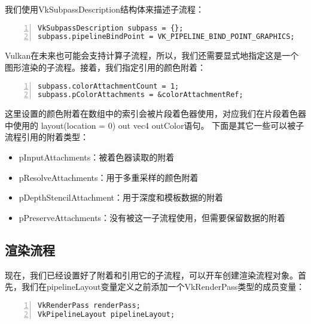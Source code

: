 \documentclass{ctexart}
\begin{document}
我们使用VkSubpassDescription结构体来描述子流程：

\begin{lstlisting}[language={[ANSI]C},keywordstyle=\color{blue!70},commentstyle=\color{red!50!green!50!blue!50},frame=shadowbox, rulesepcolor=\color{red!20!green!20!blue!20},basicstyle=\small,numbers=left, numberstyle=\tiny,breaklines=true]
VkSubpassDescription subpass = {};
subpass.pipelineBindPoint = VK_PIPELINE_BIND_POINT_GRAPHICS;
\end{lstlisting}

Vulkan在未来也可能会支持计算子流程，所以，我们还需要显式地指定这是一个图形渲染的子流程。接着，我们指定引用的颜色附着：

\begin{lstlisting}[language={[ANSI]C},keywordstyle=\color{blue!70},commentstyle=\color{red!50!green!50!blue!50},frame=shadowbox, rulesepcolor=\color{red!20!green!20!blue!20},basicstyle=\small,numbers=left, numberstyle=\tiny,breaklines=true]
subpass.colorAttachmentCount = 1;
subpass.pColorAttachments = &colorAttachmentRef;
\end{lstlisting}

这里设置的颜色附着在数组中的索引会被片段着色器使用，对应我们在片段着色器中使用的 layout(location = 0) out vec4 outColor语句。
下面是其它一些可以被子流程引用的附着类型：

\begin{itemize}
	\item pInputAttachments：被着色器读取的附着
	\item pResolveAttachments：用于多重采样的颜色附着
	\item pDepthStencilAttachment：用于深度和模板数据的附着
	\item pPreserveAttachments：没有被这一子流程使用，但需要保留数据的附着
\end{itemize}

\subsection{渲染流程}

现在，我们已经设置好了附着和引用它的子流程，可以开车创建渲染流程对象。首先，我们在pipelineLayout变量定义之前添加一个VkRenderPass类型的成员变量：

\begin{lstlisting}[language={[ANSI]C},keywordstyle=\color{blue!70},commentstyle=\color{red!50!green!50!blue!50},frame=shadowbox, rulesepcolor=\color{red!20!green!20!blue!20},basicstyle=\small,numbers=left, numberstyle=\tiny,breaklines=true]
VkRenderPass renderPass;
VkPipelineLayout pipelineLayout;
\end{lstlisting}
\end{document}
